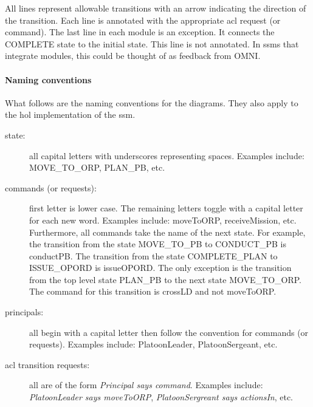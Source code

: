 \documentclass[../../main/main.tex]{subfiles}
\begin{document}
All lines represent allowable transitions with an arrow indicating the direction of the transition.  Each line is annotated with the appropriate \gls{acl} request (or command).  The last line in each module is an exception.  It connects the COMPLETE state to the initial state.  This line is not annotated. In \gls{ssm}s that integrate modules, this could be thought of as feedback from OMNI.


\paragraph*{Naming conventions}
What follows are the naming conventions for the diagrams.  They also apply to the \gls{hol} implementation of the \gls{ssm}.
\begin{description}
\item[state: ] all capital letters with underscores representing spaces.  Examples include: MOVE_TO_ORP, PLAN_PB, etc.
\item[commands (or requests):] first letter is lower case.  The remaining letters toggle with a capital letter for each new word.  Examples include: moveToORP,  receiveMission, etc.  Furthermore, all commands take the name of the next state. For example, the transition from the state MOVE_TO_PB to CONDUCT_PB is conductPB.  The transition from the state COMPLETE_PLAN to ISSUE_OPORD is issueOPORD.  The only exception is the transition from the top level state PLAN_PB to the next state MOVE_TO_ORP.  The command for this transition is crossLD and not moveToORP.
\item[principals:] all begin with a capital letter then follow the convention for commands (or requests).  Examples include: PlatoonLeader, PlatoonSergeant, etc.
\item [\gls{acl} transition requests:] all are of the form \textit{Principal says command}.  Examples include: \textit{PlatoonLeader says moveToORP}, \textit{PlatoonSergreant says actionsIn}, etc.
\end{description}

\end{document}
